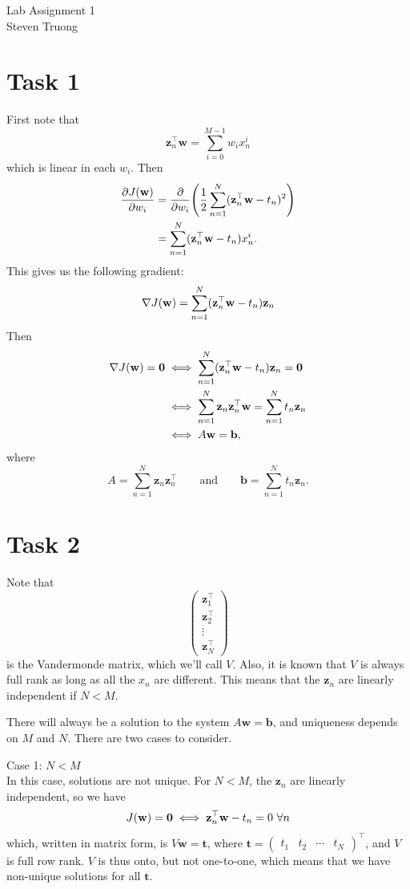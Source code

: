 \documentclass{article}
\newcommand{\T}{\top}
\newcommand{\dpd}[2]{\dfrac{\partial #1}{\partial #2}}
\newcommand{\dpdop}[1]{\dfrac{\partial}{\partial #1}}
\renewcommand{\vec}[1]{\mathbf{#1}}
\DeclarePairedDelimiter{\p}{(}{)}
\begin{document}
{\huge Lab Assignment 1} \\	
\large Steven Truong

\section*{Task 1}
First note that
\[
	\vec{z}_n^\T\vec{w} = \sum_{i=0}^{M-1} w_ix_n^i
\]
which is linear in each $w_i$. Then
\begin{align*}
	\dpd{J\p{\vec{w}}}{w_i} &= \dpdop{w_i}\p*{\frac{1}{2}\sum_{n=1}^N \p{\vec{z}_n^\T\vec{w} - t_n}^2} \\
	&= \sum_{n=1}^N \p{\vec{z}_n^\T\vec{w} - t_n}x_n^i.
\end{align*}
This gives us the following gradient:
\[
	\nabla J\p{\vec{w}} = \sum_{n=1}^N \p{\vec{z}_n^\T\vec{w} - t_n}\vec{z}_n
\]
Then
\begin{align*}
	\nabla J\p{\vec{w}} = \vec{0} &\iff \sum_{n=1}^N \p{\vec{z}_n^\T\vec{w} - t_n}\vec{z}_n = \vec{0} \\
	&\iff \sum_{n=1}^N \vec{z}_n\vec{z}_n^\T\vec{w} = \sum_{n=1}^N t_n\vec{z}_n \\
	&\iff A\vec{w} = \vec{b},
\end{align*}
where
\[
	A = \sum_{n=1}^N \vec{z}_n\vec{z}_n^\T \qquad\text{and}\qquad \vec{b} = \sum_{n=1}^N t_n\vec{z}_n.
\]

\pagebreak
\section*{Task 2}
Note that
\[
	\renewcommand{\arraystretch}{1.5}
	\begin{pmatrix}
 		\vec{z}_1^\T \\ \vec{z}_2^\T \\ \vdots \\ \vec{z}_N^\T
 	\end{pmatrix}
\]
is the Vandermonde matrix, which we'll call $V$. Also, it is known that $V$ is always full rank as long as all the $x_n$ are different. This means that the $\vec{z}_n$ are linearly independent if $N < M$.

There will always be a solution to the system $A\vec{w} = \vec{b}$, and uniqueness depends on $M$ and $N$. There are two cases to consider.

Case 1: $N < M$ \\
In this case, solutions are not unique. For $N < M$, the $\vec{z}_n$ are linearly independent, so we have
\[
	J\p{\vec{w}} = \vec{0} \iff \vec{z}_n^\T\vec{w} - t_n = 0\ \forall n
\]
which, written in matrix form, is $V\vec{w} = \vec{t}$, where $\vec{t} = \begin{pmatrix} t_1 & t_2 & \cdots & t_N \end{pmatrix}^\T$, and $V$ is full row rank. $V$ is thus onto, but not one-to-one, which means that we have non-unique solutions for all $\vec{t}$.
\end{document}

